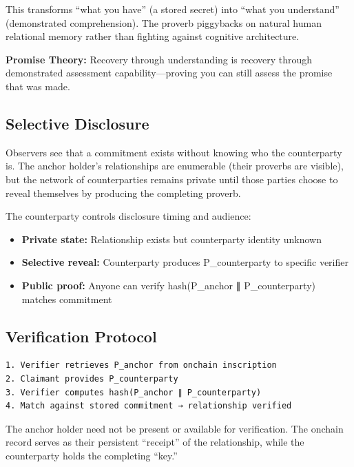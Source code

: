 \documentclass[
  11pt,
]{article}
\providecommand{\tightlist}{%
  \setlength{\itemsep}{0pt}\setlength{\parskip}{0pt}}
\begin{document}
This transforms ``what you have'' (a stored secret) into ``what you
understand'' (demonstrated comprehension). The proverb piggybacks on
natural human relational memory rather than fighting against cognitive
architecture.

\textbf{Promise Theory:} Recovery through understanding is recovery
through demonstrated assessment capability---proving you can still
assess the promise that was made.

\subsection{Selective Disclosure}\label{selective-disclosure}

Observers see that a commitment exists without knowing who the
counterparty is. The anchor holder's relationships are enumerable (their
proverbs are visible), but the network of counterparties remains private
until those parties choose to reveal themselves by producing the
completing proverb.

The counterparty controls disclosure timing and audience:

\begin{itemize}
\tightlist
\item
  \textbf{Private state:} Relationship exists but counterparty identity
  unknown
\item
  \textbf{Selective reveal:} Counterparty produces P\_counterparty to
  specific verifier
\item
  \textbf{Public proof:} Anyone can verify hash(P\_anchor ∥
  P\_counterparty) matches commitment
\end{itemize}

\subsection{Verification Protocol}\label{verification-protocol}

\begin{verbatim}
1. Verifier retrieves P_anchor from onchain inscription
2. Claimant provides P_counterparty
3. Verifier computes hash(P_anchor ∥ P_counterparty)
4. Match against stored commitment → relationship verified
\end{verbatim}

The anchor holder need not be present or available for verification. The
onchain record serves as their persistent ``receipt'' of the
relationship, while the counterparty holds the completing ``key.''
\end{document}
